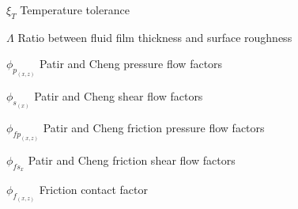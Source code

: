 \begin{simbolos}
	\item[$ \xi_{T} $] Temperature tolerance
	\item[$ \Lambda$] Ratio between fluid film thickness and surface roughness	
	\item[$ \phi_{p_{(x,z)}} $] Patir and Cheng pressure flow factors
	\item[$ \phi_{s_{(x)}} $] Patir and Cheng shear flow factors
	\item[$ \phi_{fp_{(x,z)}}$] Patir and Cheng friction pressure flow factors
	\item[$ \phi_{fs_{x}}$] Patir and Cheng friction shear flow factors
	\item[$ \phi_{f_{(x,z)}}$] Friction contact factor	
			
\end{simbolos}



\tableofcontents*


\cleardoublepage



\textual
\setcounter{page}{4}  %








